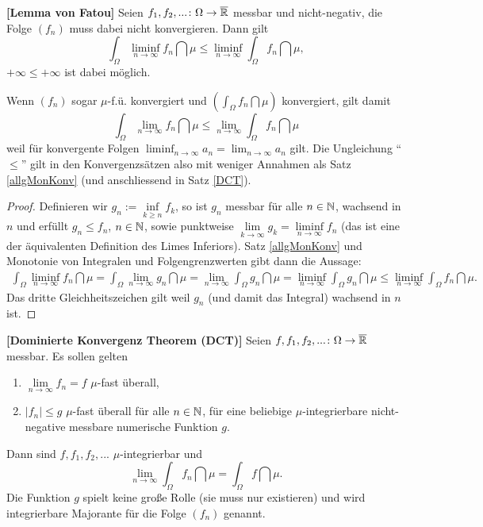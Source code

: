 \begin{satz}\label{fatou}
 \textbf{[Lemma von Fatou]}
	Seien $f_1,f_2,...\colon \Omega \to \overline{\mathbb{R}}$ messbar und nicht-negativ, die Folge $(f_n)$  muss dabei nicht konvergieren. Dann gilt \[ \int_{\Omega} \liminf\limits_{n \to \infty} f_n \dint \mu \leq \liminf\limits_{n \to \infty} \int_{\Omega} f_n \dint \mu,\]
	$+\infty\leq +\infty$ ist dabei m\"oglich.
	
\end{satz}
	Wenn $(f_n)$ sogar $\mu$-f.\"u. konvergiert und $(\int_{\Omega} f_n \dint \mu)$ konvergiert, gilt damit 
	\[ \int_{\Omega} \lim\limits_{n \to \infty} f_n \dint \mu \leq \lim\limits_{n \to \infty} \int_{\Omega} f_n \dint \mu \]
	weil f\"ur konvergente Folgen $\liminf_{n\to\infty} a_n=\lim_{n\to\infty} a_n$ gilt. Die Ungleichung \enquote{$\leq$} gilt in den Konvergenzs\"atzen also mit weniger Annahmen als Satz \ref{allgMonKonv} (und anschliessend in Satz \ref{DCT}).

\begin{proof}
	Definieren wir $g_n := \inf\limits_{k\geq n} f_k$, so ist $g_n$ messbar für alle $n \in \mathbb{N}$, wachsend in $n$ und erf\"ullt $g_n \leq f_n$, $n\in\mathbb{N}$, sowie punktweise $ \lim\limits_{k \to \infty} g_k = \liminf\limits_{n \to \infty} f_n$ (das ist eine der \"aquivalenten Definition des Limes Inferiors). Satz	\ref{allgMonKonv} und Monotonie von Integralen und Folgengrenzwerten gibt dann die Aussage:
	\begin{gather*}
		\int_{\Omega} \liminf\limits_{n \to \infty} f_n \dint \mu = \int_{\Omega} \lim\limits_{n \to \infty} g_n \dint \mu = \lim\limits_{n \to \infty} \int_{\Omega} g_n \dint \mu
		= \liminf\limits_{n \to \infty} \int_{\Omega} g_n\dint \mu\leq \liminf\limits_{n \to \infty} \int_{\Omega} f_n \dint \mu.
	\end{gather*} 
	Das dritte Gleichheitszeichen gilt weil $g_n$ (und damit das Integral) wachsend in $n$ ist.
\end{proof}

\begin{satz}\label{DCT}
\textbf{[Dominierte Konvergenz Theorem (DCT)]}
	Seien $f,f_1,f_2,...\colon \Omega \to \overline{\mathbb{R}}$ messbar. Es sollen gelten 
	\begin{enumerate}[label=(\alph*)]
		\item\label{DCA} $\lim\limits_{n \to \infty} f_n = f$ $\mu$-fast \"uberall,
		\item\label{DCB} $|f_n| \leq g$ $\mu$-fast überall f\"ur alle $n\in\mathbb{N}$, für eine beliebige $\mu$-integrierbare nicht-negative messbare numerische Funktion $g$. 
	\end{enumerate}
	Dann sind $f,f_1,f_2,...$ $\mu$-integrierbar und \[ \lim\limits_{n \to \infty} \int_{\Omega} f_n \dint \mu = \int_{\Omega} f \dint \mu. \]
	Die Funktion $g$ spielt keine gro\ss e Rolle (sie muss nur existieren) und wird integrierbare Majorante f\"ur die Folge $(f_n)$ genannt.
\end{satz}


